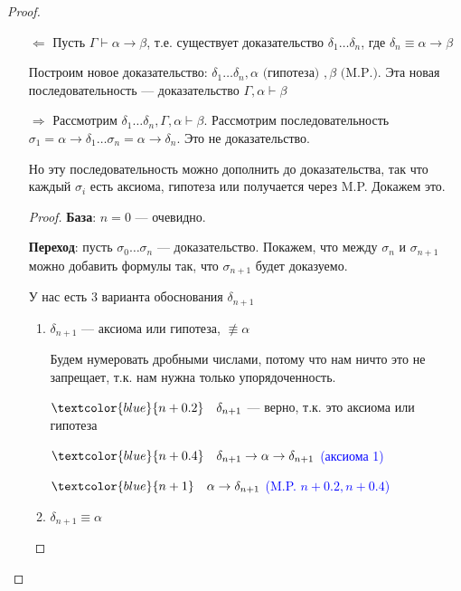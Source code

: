 \documentclass[12pt, a4paper, oneside]{book}
\begin{document}
\begin{proof}\itemfix
    \begin{itemize}
        \item [ \( \Leftarrow \)] Пусть \(\Gamma \vdash \alpha \to \beta\), т.е. существует доказательство \(\delta_1 \dots \delta_n\), где \(\delta_n \equiv \alpha \to \beta\)

              Построим новое доказательство: \(\delta_1 \dots \delta_n, \alpha \text{ (гипотеза) }, \beta \text{ (M.P.)}\). Эта новая последовательность --- доказательство \(\Gamma, \alpha \vdash \beta\)

        \item [ \( \Rightarrow \)] Рассмотрим \(\delta_1 \dots \delta_n, \Gamma, \alpha \vdash \beta\). Рассмотрим последовательность \(\sigma_1 = \alpha \to \delta_1 \dots \sigma_n = \alpha \to \delta_n\). Это не доказательство.

              Но эту последовательность можно дополнить до доказательства, так что каждый \(\sigma_i\) есть аксиома, гипотеза или получается через M.P. Докажем это.

              \begin{proof}
                  \textbf{База}: \(n = 0\) --- очевидно.

                  \textbf{Переход}: пусть \(\sigma_0 \dots \sigma_n\) --- доказательство. Покажем, что между \(\sigma_n\) и \(\sigma_{n + 1}\) можно добавить формулы так, что \(\sigma_{n + 1}\) будет доказуемо.

                  У нас есть 3 варианта обоснования \(\delta_{n + 1}\)
                  \begin{enumerate}
                      \item \(\delta_{n + 1}\) --- аксиома или гипотеза, \(\not\equiv \alpha\)

                            Будем нумеровать дробными числами, потому что нам ничто это не запрещает, т.к. нам нужна только упорядоченность.

                            \(\textcolor{blue}{n + 0.2} \quad \delta_{n + 1}\) --- верно, т.к. это аксиома или гипотеза

                            \(\textcolor{blue}{n + 0.4} \quad \delta_{n + 1} \to \alpha \to \delta_{n + 1}\) \textcolor{blue}{(аксиома 1)}

                            \(\textcolor{blue}{n + 1} \quad \alpha \to \delta_{n + 1}\) \textcolor{blue}{(M.P. \(n + 0.2, n + 0.4\))}

                      \item \(\delta_{n + 1} \equiv \alpha\)


\end{enumerate}
\end{proof}
\end{itemize}
\end{proof}
\end{document}
